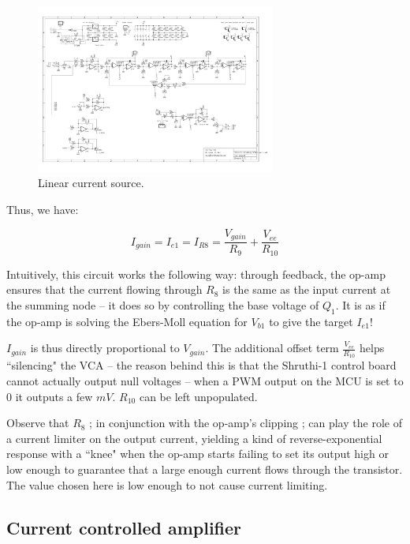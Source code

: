\documentclass[a4paper,11pt]{article}
\begin{document}
\begin{figure}
\centering
\includegraphics[width=0.7\textwidth]{smr4mkII_linear_current_source.pdf}
\caption{Linear current source.}
\label{fig:linear}
\end{figure}

Thus, we have:

\begin{equation}
I_{gain} = I_{e1} = I_{R8} = \frac{V_{gain}}{R_9} + \frac{V_{ee}}{R_{10}}
\end{equation}

Intuitively, this circuit works the following way: through feedback, the op-amp ensures that the current flowing through $R_8$ is the same as the input current at the summing node -- it does so by controlling the base voltage of $Q_1$. It is as if the op-amp is solving the Ebers-Moll equation for $V_{b1}$ to give the target $I_{e1}$!

$I_{gain}$ is thus directly proportional to $V_{gain}$. The additional offset term $\frac{V_{ee}}{R_{10}}$ helps ``silencing" the VCA -- the reason behind this is that the Shruthi-1 control board cannot actually output null voltages -- when a PWM output on the MCU is set to 0 it outputs a few $mV$. $R_{10}$ can be left unpopulated.

Observe that $R_8$ ; in conjunction with the op-amp's clipping ; can play the role of a current limiter on the output current, yielding a kind of reverse-exponential response with a ``knee" when the op-amp starts failing to set its output high or low enough to guarantee that a large enough current flows through the transistor. The value chosen here is low enough to not cause current limiting.

\subsection{Current controlled amplifier}
\end{document}
